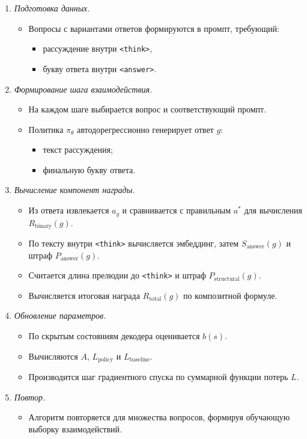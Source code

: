 \begin{enumerate}
    \item \emph{Подготовка данных.}
    \begin{itemize}
        \item Вопросы с вариантами ответов формируются в промпт, требующий:
        \begin{itemize}
            \item рассуждение внутри \verb|<think>|,
            \item букву ответа внутри \verb|<answer>|.
        \end{itemize}
    \end{itemize}
    \item \emph{Формирование шага взаимодействия.}
    \begin{itemize}
        \item На каждом шаге выбирается вопрос и соответствующий промпт.
        \item Политика $\pi_\theta$ автодорегрессионно генерирует ответ $g$:
        \begin{itemize}
            \item текст рассуждения;
            \item финальную букву ответа.
        \end{itemize}
    \end{itemize}
    \item \emph{Вычисление компонент награды.}
    \begin{itemize}
        \item Из ответа извлекается $a_g$ и сравнивается с правильным $a^*$ 
        для вычисления $R_{\text{binary}}(g)$.
        \item По тексту внутри \verb|<think>| вычисляется эмбеддинг, 
        затем $S_{\text{answer}}(g)$ и штраф $P_{\text{answer}}(g)$.
        \item Считается длина прелюдии до \verb|<think>| и штраф 
        $P_{\text{structural}}(g)$.
        \item Вычисляется итоговая награда $R_{\text{total}}(g)$ по 
        композитной формуле.
    \end{itemize}
    \item \emph{Обновление параметров.}
    \begin{itemize}
        \item По скрытым состояниям декодера оценивается $b(s)$.
        \item Вычисляются $A$, $L_{\text{policy}}$ и $L_{\text{baseline}}$.
        \item Производится шаг градиентного спуска по суммарной функции потерь $L$.
    \end{itemize}
    \item \emph{Повтор.}
    \begin{itemize}
        \item Алгоритм повторяется для множества вопросов, формируя обучающую 
        выборку взаимодействий.
    \end{itemize}
\end{enumerate}

